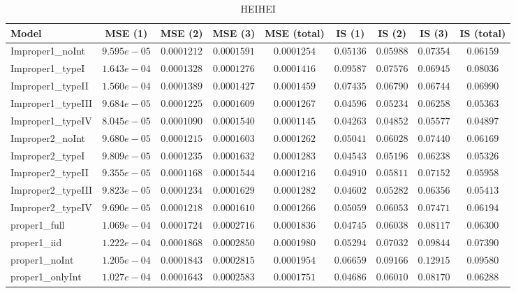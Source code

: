 \begin{table}

\caption{\label{tab:model-choice-sc6}HEIHEI}
\centering
\begin{tabular}{lcccccccc}
\hline
Model  & MSE (1) & MSE (2) & MSE (3) & MSE (total) & IS (1) & IS (2) & IS (3) & \multicolumn{1}{c}{IS (total)} \\ 
\hline
Improper1_noInt  & $9.595e-05$ & $0.0001212$ & $0.0001591$ & $0.0001254$ & $0.05136$ & $0.05988$ & $0.07354$ & $0.06159$ \\
Improper1_typeI  & $1.643e-04$ & $0.0001328$ & $0.0001276$ & $0.0001416$ & $0.09587$ & $0.07576$ & $0.06945$ & $0.08036$ \\
Improper1_typeII  & $1.560e-04$ & $0.0001389$ & $0.0001427$ & $0.0001459$ & $0.07435$ & $0.06790$ & $0.06744$ & $0.06990$ \\
Improper1_typeIII  & $9.684e-05$ & $0.0001225$ & $0.0001609$ & $0.0001267$ & $0.04596$ & $0.05234$ & $0.06258$ & $0.05363$ \\
Improper1_typeIV  & $8.045e-05$ & $0.0001090$ & $0.0001540$ & $0.0001145$ & $0.04263$ & $0.04852$ & $0.05577$ & $0.04897$ \\
Improper2_noInt  & $9.680e-05$ & $0.0001215$ & $0.0001603$ & $0.0001262$ & $0.05041$ & $0.06028$ & $0.07440$ & $0.06169$ \\
Improper2_typeI  & $9.809e-05$ & $0.0001235$ & $0.0001632$ & $0.0001283$ & $0.04543$ & $0.05196$ & $0.06238$ & $0.05326$ \\
Improper2_typeII  & $9.355e-05$ & $0.0001168$ & $0.0001544$ & $0.0001216$ & $0.04910$ & $0.05811$ & $0.07152$ & $0.05958$ \\
Improper2_typeIII  & $9.823e-05$ & $0.0001234$ & $0.0001629$ & $0.0001282$ & $0.04602$ & $0.05282$ & $0.06356$ & $0.05413$ \\
Improper2_typeIV  & $9.690e-05$ & $0.0001218$ & $0.0001610$ & $0.0001266$ & $0.05059$ & $0.06053$ & $0.07471$ & $0.06194$ \\
proper1_full  & $1.069e-04$ & $0.0001724$ & $0.0002716$ & $0.0001836$ & $0.04745$ & $0.06038$ & $0.08117$ & $0.06300$ \\
proper1_iid  & $1.222e-04$ & $0.0001868$ & $0.0002850$ & $0.0001980$ & $0.05294$ & $0.07032$ & $0.09844$ & $0.07390$ \\
proper1_noInt  & $1.205e-04$ & $0.0001843$ & $0.0002815$ & $0.0001954$ & $0.06659$ & $0.09166$ & $0.12915$ & $0.09580$ \\
proper1_onlyInt  & $1.027e-04$ & $0.0001643$ & $0.0002583$ & $0.0001751$ & $0.04686$ & $0.06010$ & $0.08170$ & $0.06288$ \\

\end{tabular}
\end{table}
